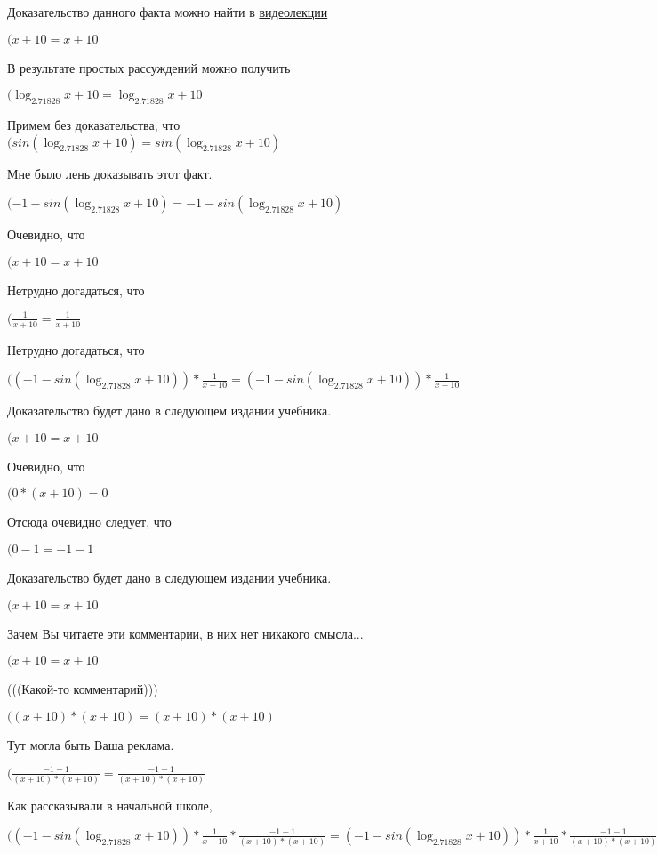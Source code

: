 \documentclass[12pt,a4paper,fleqn]{article}
\theoremstyle{definition}
\begin{document}
Доказательство данного факта можно найти в \href{https://www.youtube.com/watch?v=dQw4w9WgXcQ}{видеолекции}

$( x  +  10  =  x  +  10 $

В результате простых рассуждений можно получить

$(\log_{ 2.71828 }{ x  +  10 } = \log_{ 2.71828 }{ x  +  10 }$

Примем без доказательства, что
$(sin(\log_{ 2.71828 }{ x  +  10 }) = sin(\log_{ 2.71828 }{ x  +  10 })$

Мне было лень доказывать этот факт.

$( -1  - sin(\log_{ 2.71828 }{ x  +  10 }) =  -1  - sin(\log_{ 2.71828 }{ x  +  10 })$

Очевидно, что

$( x  +  10  =  x  +  10 $

Нетрудно догадаться, что

$(\frac{ 1 }{ x  +  10 }
 = \frac{ 1 }{ x  +  10 }
$

Нетрудно догадаться, что

$(( -1  - sin(\log_{ 2.71828 }{ x  +  10 })) * \frac{ 1 }{ x  +  10 }
 = ( -1  - sin(\log_{ 2.71828 }{ x  +  10 })) * \frac{ 1 }{ x  +  10 }
$

Доказательство будет дано в следующем издании учебника.

$( x  +  10  =  x  +  10 $

Очевидно, что

$( 0  * ( x  +  10 ) =  0 $

Отсюда очевидно следует, что

$( 0  -  1  =  -1  -  1 $

Доказательство будет дано в следующем издании учебника.

$( x  +  10  =  x  +  10 $

Зачем Вы читаете эти комментарии, в них нет никакого смысла...

$( x  +  10  =  x  +  10 $

(((Какой-то комментарий)))

$(( x  +  10 ) * ( x  +  10 ) = ( x  +  10 ) * ( x  +  10 )$

Тут могла быть Ваша реклама.

$(\frac{ -1  -  1 }{( x  +  10 ) * ( x  +  10 )}
 = \frac{ -1  -  1 }{( x  +  10 ) * ( x  +  10 )}
$

Как рассказывали в начальной школе,

$(( -1  - sin(\log_{ 2.71828 }{ x  +  10 })) * \frac{ 1 }{ x  +  10 }
 * \frac{ -1  -  1 }{( x  +  10 ) * ( x  +  10 )}
 = ( -1  - sin(\log_{ 2.71828 }{ x  +  10 })) * \frac{ 1 }{ x  +  10 }
 * \frac{ -1  -  1 }{( x  +  10 ) * ( x  +  10 )}
$
\end{document}
